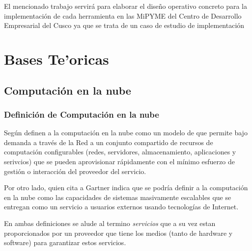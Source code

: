 El mencionado trabajo servir\'a para elaborar el dise\~no operativo concreto para la
implementaci\'on de cada herramienta en las MiPYME del Centro de Desarrollo
Empresarial del Cusco ya que se trata de un caso de estudio de implementaci\'on

\section{Bases Te'oricas}

\subsection{Computaci\'on en la nube}

\subsubsection{Definici\'on de Computaci\'on en la nube}
Seg\'un \cite{nist} definen a la computaci\'on en la nube como un modelo de
que permite bajo demanda a trav\'es de la Red a un conjunto compartido de recursos
de computaci\'on configurables (redes, servidores, almacenamiento, aplicaciones y serivcios)
que se pueden aprovisionar r\'apidamente con el m\'inimo esfuerzo de gesti\'on o interacci\'on
del proveedor del servicio.

Por otro lado, \cite{msolutions} quien cita a Gartner indica que se podr\'ia definir a la
computaci\'on en la nube como las capacidades de sistemas masivamente escalables que se entregan
como un servicio a usuarios externos usando tecnolog\'ias de Internet.

En ambas definiciones se alude al termino \emph{servicios} que a su vez estan proporcionados
por un proveedor que tiene los medios (tanto de hardware y software) para garantizar estos servicios.

